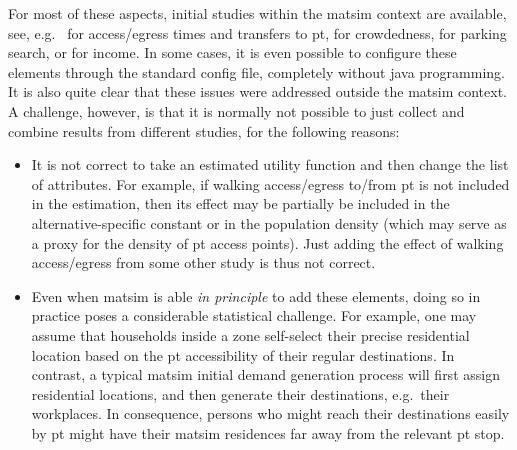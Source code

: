 For most of these aspects, initial studies within the \gls{matsim} context are available, see, e.g.\ 
%
\citet{MoyoNagelptLineCalibration,MoyoNagelptNetCalibration} for access/egress times and transfers to \acrfull{pt}, 
%
\citet{BoumanEtc2013Crowdedness} 
for crowdedness,
%
\cite{WaraichEtAl_STRC_2013} for parking search,
%
or \cite{KickhoeferEtAl_Transportation_2011} for income.
%
In some cases, it is even possible to configure these elements through the standard config file, completely without \gls{java} programming.
%
It is also quite clear that these issues were addressed outside the \gls{matsim} context.
%
A challenge, however, is that it is normally not possible to just collect and combine results from different studies, for the following reasons:
\begin{itemize}

\item It is not correct to take an estimated utility function and then change the list of attributes.  
%
For example, if walking access/egress to/from \gls{pt} is not included in the estimation, then its effect may be partially be included in the alternative-specific constant or in the population density (which may serve as a proxy for the density of \gls{pt} access points).  Just adding the effect of walking access/egress from some other study is thus not correct.

\item Even when \gls{matsim} is able \emph{in principle} to add these elements, doing so in practice poses a considerable statistical challenge.  For example, one may assume that households inside a zone self-select their precise residential location based on the \gls{pt} accessibility of their regular destinations.  
%
In contrast, a typical \gls{matsim} initial demand generation process will first assign residential locations, and then generate their destinations, e.g.\ their workplaces.
%
In consequence, persons who might reach their destinations easily by \gls{pt} might have their \gls{matsim} residences far away from the relevant \gls{pt} stop.

\end{itemize}

